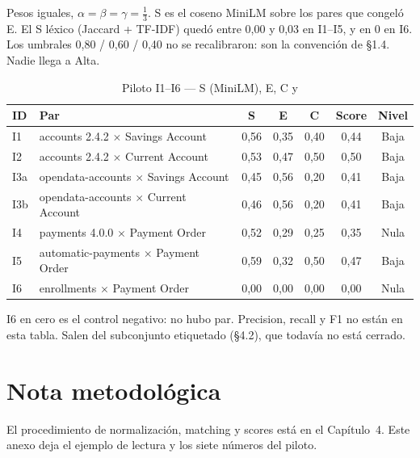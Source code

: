 Pesos iguales, $\alpha=\beta=\gamma=\frac{1}{3}$. S es el coseno MiniLM sobre los pares que
congeló E. El S léxico (Jaccard + TF-IDF) quedó entre 0,00 y 0,03 en I1--I5, y en 0 en I6.
Los umbrales 0,80 / 0,60 / 0,40 no se recalibraron: son la convención de §1.4. Nadie llega a
Alta.

\begin{table}[H]
  \centering
  \caption{Piloto I1--I6 --- S (MiniLM), E, C y \AlignmentScore{}}
  \label{tab:anexo-f-escenarios}
  \footnotesize
  \begin{tabular}{@{}lp{4.4cm}ccccc@{}}
    \toprule
    \textbf{ID} & \textbf{Par} & \textbf{S} & \textbf{E} & \textbf{C} & \textbf{Score} & \textbf{Nivel} \\
    \midrule
    I1 & accounts 2.4.2 $\times$ Savings Account & 0,56 & 0,35 & 0,40 & 0,44 & Baja \\
    I2 & accounts 2.4.2 $\times$ Current Account & 0,53 & 0,47 & 0,50 & 0,50 & Baja \\
    I3a & opendata-accounts $\times$ Savings Account & 0,45 & 0,56 & 0,20 & 0,41 & Baja \\
    I3b & opendata-accounts $\times$ Current Account & 0,46 & 0,56 & 0,20 & 0,41 & Baja \\
    I4 & payments 4.0.0 $\times$ Payment Order & 0,52 & 0,29 & 0,25 & 0,35 & Nula \\
    I5 & automatic-payments $\times$ Payment Order & 0,59 & 0,32 & 0,50 & 0,47 & Baja \\
    I6 & enrollments $\times$ Payment Order & 0,00 & 0,00 & 0,00 & 0,00 & Nula \\
    \bottomrule
  \end{tabular}
\end{table}

I6 en cero es el control negativo: no hubo par. Precision, recall y F1 no están en esta tabla.
Salen del subconjunto etiquetado (§4.2), que todavía no está cerrado.

\section{Nota metodológica}

El procedimiento de normalización, matching y scores está en el Capítulo~4. Este anexo deja el
ejemplo de lectura y los siete números del piloto.
